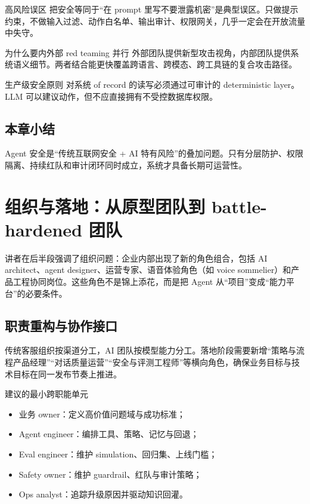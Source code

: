 \documentclass[a4paper]{article}
\begin{document}
\begin{warningbox}{高风险误区}
把安全等同于“在 prompt 里写不要泄露机密”是典型误区。只做提示约束，不做输入过滤、动作白名单、输出审计、权限网关，几乎一定会在开放流量中失守。
\end{warningbox}

\begin{knowledgebox}{为什么要内外部 red teaming 并行}
外部团队提供新型攻击视角，内部团队提供系统语义细节。两者结合能更快覆盖跨语言、跨模态、跨工具链的复合攻击路径。
\end{knowledgebox}

\begin{importantbox}{生产级安全原则}
对系统 of record 的读写必须通过可审计的 deterministic layer。LLM 可以建议动作，但不应直接拥有不受控数据库权限。
\end{importantbox}

\subsection{本章小结}

Agent 安全是“传统互联网安全 + AI 特有风险”的叠加问题。只有分层防护、权限隔离、持续红队和审计闭环同时成立，系统才具备长期可运营性。

\section{组织与落地：从原型团队到 battle-hardened 团队}

讲者在后半段强调了组织问题：企业内部出现了新的角色组合，包括 AI architect、agent designer、运营专家、语音体验角色（如 voice sommelier）和产品工程协同岗位。这些角色不是锦上添花，而是把 Agent 从“项目”变成“能力平台”的必要条件。

\subsection{职责重构与协作接口}

传统客服组织按渠道分工，AI 团队按模型能力分工。落地阶段需要新增“策略与流程产品经理”“对话质量运营”“安全与评测工程师”等横向角色，确保业务目标与技术目标在同一发布节奏上推进。

\begin{knowledgebox}{建议的最小跨职能单元}
\begin{itemize}[leftmargin=1.5em]
    \item 业务 owner：定义高价值问题域与成功标准；
    \item Agent engineer：编排工具、策略、记忆与回退；
    \item Eval engineer：维护 simulation、回归集、上线门槛；
    \item Safety owner：维护 guardrail、红队与审计策略；
    \item Ops analyst：追踪升级原因并驱动知识回灌。
\end{itemize}
\end{knowledgebox}
\end{document}
